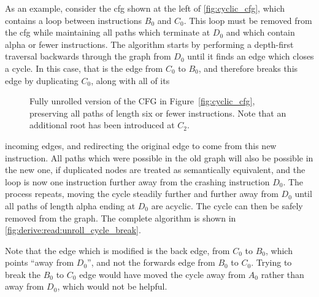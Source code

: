 As an example, consider the \gls{cfg} shown at the left of
\autoref{fig:cyclic_cfg}, which contains a loop between instructions
$B_0$ and $C_0$.  This loop must be removed from the \gls{cfg} while
maintaining all paths which terminate at $D_0$ and which contain
\gls{alpha} or fewer instructions.  The algorithm starts by performing
a depth-first traversal backwards through the graph from $D_0$ until
it finds an edge which closes a cycle.  In this case, that is the edge
from $C_0$ to $B_0$, and {\technique} therefore breaks this edge by
duplicating $C_0$, along with all of its
\begin{wrapfigure}{o}{3.9cm}
\begin{figgure}
\caption{Fully unrolled version of the CFG in
  Figure~\ref{fig:cyclic_cfg}, preserving all paths of length six or
  fewer instructions.  Note that an additional root has been
  introduced at $C_2$.}
\label{fig:unrolled_cyclic_cfg}
\end{figgure}
\vspace{-24pt}
\end{wrapfigure}
incoming edges, and redirecting the original edge to come from this
new instruction.  All paths which were possible in the old graph will
also be possible in the new one, if duplicated nodes are treated as
semantically equivalent, and the loop is now one instruction further
away from the crashing instruction $D_0$.  The process repeats, moving
the cycle steadily further and further away from $D_0$ until all paths
of length \gls{alpha} ending at $D_0$ are acyclic.  The cycle can then
be safely removed from the graph.  The complete algorithm is shown in
\autoref{fig:derive:read:unroll_cycle_break}.

Note that the edge which is modified is the back edge, from $C_0$ to
$B_0$, which points ``away from $D_0$'', and not the forwards edge
from $B_0$ to $C_0$.  Trying to break the $B_0$ to $C_0$ edge would
have moved the cycle away from $A_0$ rather than away from $D_0$,
which would not be helpful.

